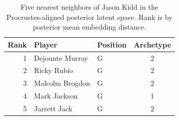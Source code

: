 \begin{table}[htbp]
  \centering\small
  \begin{tabular}{rllc}
    \toprule
    Rank & Player & Position & Archetype \\
    \midrule
    1 & Dejounte Murray & G & 2 \\
    2 & Ricky Rubio & G & 2 \\
    3 & Malcolm Brogdon & G & 2 \\
    4 & Mark Jackson & G & 1 \\
    5 & Jarrett Jack & G & 2 \\
    \bottomrule
  \end{tabular}
  \caption{Five nearest neighbors of Jason Kidd in the Procrustes-aligned posterior latent space. Rank is by posterior mean embedding distance.}
  \label{tab:Jason_Kidd_neighbors}
\end{table}

